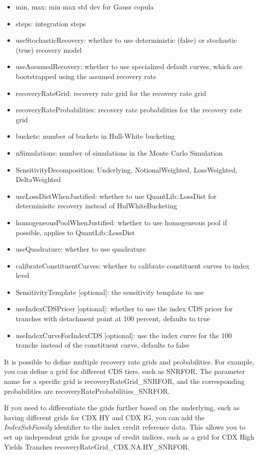 \begin{itemize}
\item min, max: min max std dev for Gauss copula
\item steps: integration steps
\item useStochasticRecovery: whether to use deterministic (false) or stochastic (true) recovery model
\item useAssumedRecovery: whether to use specialized default curves, which are bootstrapped using the assumed recovery rate
\item recoveryRateGrid: recovery rate grid for the recovery rate grid
\item recoveryRateProbabilities: recovery rate probabilities for the recovery rate grid
\item buckets: number of buckets in Hull-White bucketing
\item nSimulations: number of simulations in the Monte Carlo Simulation
\item SensitivityDecomposition: Underlying, NotionalWeighted, LossWeighted, DeltaWeighted
\item useLossDistWhenJustified: whether to use QuantLib::LossDist for determinisitc recovery instead of HulWhiteBucketing
\item homogeneousPoolWhenJustified: whether to use homogeneous pool if possible, applies to QuantLib::LossDist
\item useQuadrature: whether to use quadrature
\item calibrateConstituentCurves: whether to calibrate constituent curves to index level
\item SensitivityTemplate [optional]: the sensitivity template to use
\item useIndexCDSPricer [optional]: whether to use the index CDS pricer for tranches with detachment point at 100 percent, defaults to true
\item useIndexCurveForIndexCDS [optional]: use the index curve for the 100 tranche instead of the constituent curve, defaults to false
\end{itemize}

It is possible to define multiple recovery rate grids and probabilities.
For example, you can define a grid for different CDS tiers, such as SNRFOR. The parameter name for a specific grid is recoveryRateGrid\_SNRFOR,
and the corresponding probabilities are recoveryRateProbabilities\_SNRFOR.

If you need to differentiate the grids further based on the underlying, such as having different grids for CDX HY and CDX IG,
you can add the \emph{IndexSubFamily} identifier to the index credit reference data.
This allows you to set up independent grids for groups of credit indices,
such as a grid for CDX High Yields Tranches recoveryRateGrid\_CDX.NA.HY\_SNRFOR.


